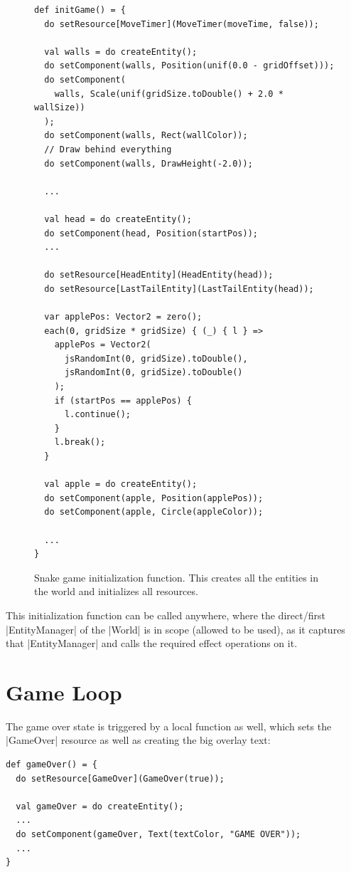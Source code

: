 \begin{figure}[h!]
\begin{lstlisting}
def initGame() = {
  do setResource[MoveTimer](MoveTimer(moveTime, false));

  val walls = do createEntity();
  do setComponent(walls, Position(unif(0.0 - gridOffset)));
  do setComponent(
	walls, Scale(unif(gridSize.toDouble() + 2.0 * wallSize))
  );
  do setComponent(walls, Rect(wallColor));
  // Draw behind everything
  do setComponent(walls, DrawHeight(-2.0));

  ...

  val head = do createEntity();
  do setComponent(head, Position(startPos));
  ...

  do setResource[HeadEntity](HeadEntity(head));
  do setResource[LastTailEntity](LastTailEntity(head));

  var applePos: Vector2 = zero();
  each(0, gridSize * gridSize) { (_) { l } =>
    applePos = Vector2(
	  jsRandomInt(0, gridSize).toDouble(),
	  jsRandomInt(0, gridSize).toDouble()
	);
    if (startPos == applePos) {
      l.continue();
    }
    l.break();
  }

  val apple = do createEntity();
  do setComponent(apple, Position(applePos));
  do setComponent(apple, Circle(appleColor));

  ...
}
\end{lstlisting}
\caption{Snake game initialization function. This creates all the entities in the world and initializes all resources.}
\label{fig:caseinit}
\end{figure}

This initialization function can be called anywhere, where the direct/first |EntityManager| of the |World| is in scope (allowed to be used), as it captures that |EntityManager| and calls the required effect operations on it.

\section{Game Loop}

The game over state is triggered by a local function as well, which sets the |GameOver| resource as well as creating the big overlay text:

\begin{lstlisting}
def gameOver() = {
  do setResource[GameOver](GameOver(true));

  val gameOver = do createEntity();
  ...
  do setComponent(gameOver, Text(textColor, "GAME OVER"));
  ...
}
\end{lstlisting}


